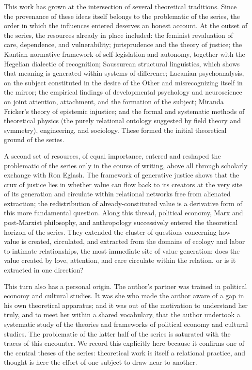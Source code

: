 This work has grown at the intersection of several theoretical traditions. Since the provenance of these ideas itself belongs to the problematic of the series, the order in which the influences entered deserves an honest account. At the outset of the series, the resources already in place included: the feminist revaluation of care, dependence, and vulnerability; jurisprudence and the theory of justice; the Kantian normative framework of self-legislation and autonomy, together with the Hegelian dialectic of recognition; Saussurean structural linguistics, which shows that meaning is generated within systems of difference; Lacanian psychoanalysis, on the subject constituted in the desire of the Other and misrecognizing itself in the mirror; the empirical findings of developmental psychology and neuroscience on joint attention, attachment, and the formation of the subject; Miranda Fricker's theory of epistemic injustice; and the formal and systematic methods of theoretical physics (the purely relational ontology suggested by field theory and symmetry), engineering, and sociology. These formed the initial theoretical ground of the series.

A second set of resources, of equal importance, entered and reshaped the problematic of the series only in the course of writing, above all through scholarly exchange with Ron Eglash. The framework of generative justice shows that the crux of justice lies in whether value can flow back to its creators at the very site of its generation and circulate within relational networks free from alienated extraction; the redistribution of already-constituted value is a derivative form of this more fundamental question. Along this thread, political economy, Marx and post-Marxist philosophy, and anthropology successively entered the theoretical horizon of the series. They extended the cluster of questions concerning how value is created, circulated, and extracted from the domains of ecology and labor to intimate relationships, the most immediate site of value generation: does the value created by love, attention, and care circulate within the relation, or is it extracted in one direction?

This turn also has a personal origin. The author's partner was trained in political economy and cultural studies. It was she who made the author aware of a gap in his own theoretical apparatus; and it was out of the motivation to understand her truly, and to meet her within a shared vocabulary, that the author undertook a systematic study of the theories and frameworks of political economy and cultural studies. The problematic of the latter half of the series is saturated with the traces of this encounter. We record this explicitly here because it confirms one of the central theses of the series: theoretical work is itself a relational practice, and thought is here the effort of one subject to draw near to another.

